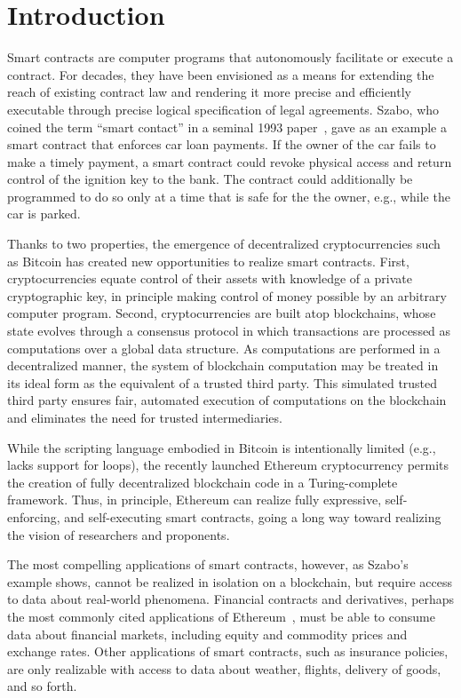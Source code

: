 \section{Introduction}

Smart contracts are computer programs that autonomously facilitate or execute a contract. For decades, they have been envisioned as a means for extending the reach of existing contract law and rendering it more precise and efficiently executable through precise logical specification of legal agreements. Szabo, who coined the term ``smart contact'' in a seminal 1993 paper~\cite{}, gave as an example a smart contract that enforces car loan payments. If the owner of the car fails to make a timely payment, a smart contract could revoke physical access and return control of the ignition key to the bank. The contract could additionally be programmed to do so only at a time that is safe for the the owner, e.g., while the car is parked.

Thanks to two properties, the emergence of decentralized cryptocurrencies such as Bitcoin has created new opportunities to realize smart contracts. First, cryptocurrencies equate control of their assets with knowledge of a private cryptographic key, in principle making control of money possible by an arbitrary computer program. Second, cryptocurrencies are built atop blockchains, whose state evolves through a consensus protocol in which transactions are processed as computations over a global data structure. As computations are performed in a decentralized manner, the system of blockchain computation may be treated in its ideal form as the equivalent of a trusted third party. This simulated trusted third party ensures fair, automated execution of computations on the blockchain and eliminates the need for trusted intermediaries. 

While the scripting language embodied in Bitcoin is intentionally limited (e.g., lacks support for loops), the recently launched Ethereum cryptocurrency permits the creation of fully decentralized blockchain code in a Turing-complete framework. Thus, in principle, Ethereum can realize fully expressive, self-enforcing, and self-executing smart contracts, going a long way toward realizing the vision of researchers and proponents.  

The most compelling applications of smart contracts, however, as Szabo's example shows, cannot be realized in isolation on a blockchain, but require access to data about real-world phenomena. Financial contracts and derivatives, perhaps the most commonly cited applications of Ethereum~\cite{}, must be able to consume data about financial markets, including equity and commodity prices and exchange rates. Other applications of smart contracts, such as insurance policies, are only realizable with access to data about weather, flights, delivery of goods, and so forth. 

